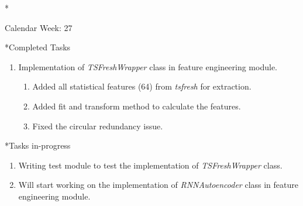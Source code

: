 \documentclass[11pt,a4paper]{article}
\begin{document}
\newpage
\begin{section}*{Calendar Week: 27 \hfill \date{09 July, 2021}}
 \begin{subsection}*{Completed Tasks}
     \begin{enumerate}
         \item Implementation of \textit{TSFreshWrapper} class in feature engineering module.
               \begin{enumerate}
                   \item Added all statistical features (64) from \textit{tsfresh} for extraction.
                   \item Added fit and transform method to calculate the features.
                   \item Fixed the circular redundancy issue.
               \end{enumerate}
     \end{enumerate}
 \end{subsection}
 \begin{subsection}*{Tasks in-progress}
     \begin{enumerate}
         \item Writing test module to test the implementation of \textit{TSFreshWrapper} class.
         \item Will start working on the implementation of \textit{RNNAutoencoder} class in feature engineering module.
     \end{enumerate}
 \end{subsection}
\end{section}
\end{document}
